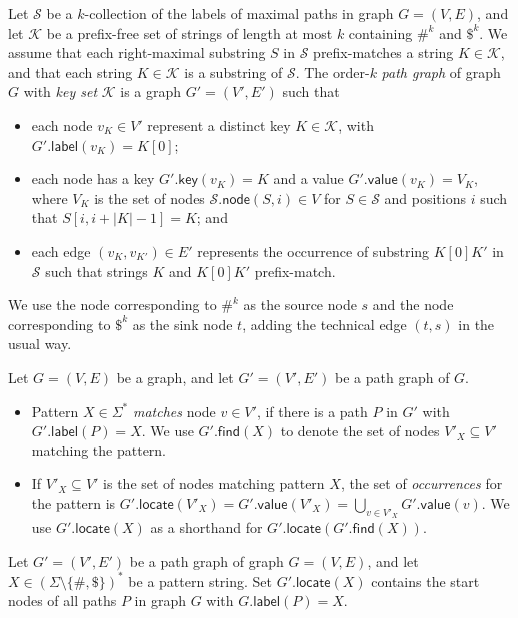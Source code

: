 \documentclass[a4paper,UKenglish]{lipics-v2016}
\newcommand{\set}[1]{\ensuremath{\{ #1 \}}}
\newcommand{\abs}[1]{\ensuremath{\lvert #1 \rvert}}
\newcommand{\find}{\ensuremath{\mathsf{find}}}
\newcommand{\locate}{\ensuremath{\mathsf{locate}}}
\newcommand{\glabel}{\ensuremath{\mathsf{label}}}
\newcommand{\gkey}{\ensuremath{\mathsf{key}}}
\newcommand{\gvalue}{\ensuremath{\mathsf{value}}}
\newcommand{\gnode}{\ensuremath{\mathsf{node}}}
\newcommand{\kcollection}[1]{$#1$\nobreakdash-collection}
\newcommand{\orderk}[1]{order\nobreakdash-$#1$}
\newcommand{\patternset}{\ensuremath{(\Sigma \setminus \set{\#, \$})^{\ast}}}
\begin{document}
\begin{definition}
Let $\mathcal{S}$ be a \kcollection{k} of the labels of maximal paths in graph $G = (V, E)$, and let $\mathcal{K}$ be a prefix-free set of strings of length at most $k$ containing $\#^{k}$ and $\$^{k}$. We assume that each right-maximal substring $S$ in $\mathcal{S}$ prefix-matches a string $K \in \mathcal{K}$, and that each string $K \in \mathcal{K}$ is a substring of $\mathcal{S}$. The \orderk{k} \emph{path graph} of graph $G$ with \emph{key set} $\mathcal{K}$ is a graph $G' = (V', E')$ such that
\begin{itemize}
\item each node $v_{K} \in V'$ represent a distinct key $K \in \mathcal{K}$, with $G'.\glabel(v_{K}) = K[0]$;
\item each node has a key $G'.\gkey(v_{K}) = K$ and a value $G'.\gvalue(v_{K}) = V_{K}$, where $V_{K}$ is the set of nodes $\mathcal{S}.\gnode(S, i) \in V$ for $S \in \mathcal{S}$ and positions $i$ such that $S[i, i+\abs{K}-1] = K$; and
\item each edge $(v_{K}, v_{K'}) \in E'$ represents the occurrence of substring $K[0] K'$ in $\mathcal{S}$ such that strings $K$ and $K[0] K'$ prefix-match.
\end{itemize}
We use the node corresponding to $\#^{k}$ as the source node $s$ and the node corresponding to $\$^{k}$ as the sink node $t$, adding the technical edge $(t, s)$ in the usual way.
\end{definition}

\begin{definition}
Let $G = (V, E)$ be a graph, and let $G' = (V', E')$ be a path graph of $G$.
\begin{itemize}
\item Pattern $X \in \Sigma^{\ast}$ \emph{matches} node $v \in V'$, if there is a path $P$ in $G'$ with $G'.\glabel(P) = X$. We use $G'.\find(X)$ to denote the set of nodes $V'_{X} \subseteq V'$ matching the pattern.
\item If $V'_{X} \subseteq V'$ is the set of nodes matching pattern $X$, the set of \emph{occurrences} for the pattern is $G'.\locate(V'_{X}) = G'.\gvalue(V'_{X}) = \bigcup_{v \in V'_{X}} G'.\gvalue(v)$. We use $G'.\locate(X)$ as a shorthand for $G'.\locate(G'.\find(X))$.
\end{itemize}
\end{definition}

\begin{lemma}\label{lemma:pg-fn}
Let $G' = (V', E')$ be a path graph of graph $G = (V, E)$, and let $X \in \patternset$ be a pattern string. Set $G'.\locate(X)$ contains the start nodes of all paths $P$ in graph $G$ with $G.\glabel(P) = X$.
\end{lemma}
\end{document}
